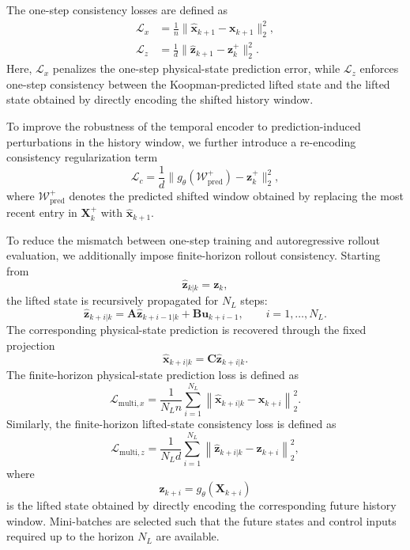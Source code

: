 \documentclass[journal]{IEEEtran}
\newcommand{\vx}{\mathbf{x}}
\newcommand{\vu}{\mathbf{u}}
\newcommand{\vz}{\mathbf{z}}
\newcommand{\mA}{\mathbf{A}}
\newcommand{\mB}{\mathbf{B}}
\newcommand{\mC}{\mathbf{C}}
\newcommand{\mX}{\mathbf{X}}
\begin{document}
{\color{red}The one-step consistency losses are defined as
\begin{align}
    \mathcal{L}_{x} &=
    \frac{1}{n}\|\hat{\vx}_{k+1}-\vx_{k+1}\|_2^2,
    \label{eq:loss_x}\\
    \mathcal{L}_{z} &=
    \frac{1}{d}\|\hat{\vz}_{k+1}-\vz_k^{+}\|_2^2.
    \label{eq:loss_z}
\end{align}
Here, $\mathcal{L}_x$ penalizes the one-step physical-state prediction error, while $\mathcal{L}_z$ enforces one-step consistency between the Koopman-predicted lifted state and the lifted state obtained by directly encoding the shifted history window.

To improve the robustness of the temporal encoder to prediction-induced perturbations in the history window, we further introduce a re-encoding consistency regularization term
\begin{equation}
    \mathcal{L}_{c} =
    \frac{1}{d}
    \bigl\|g_\theta(\mathcal{W}^{+}_{\mathrm{pred}})-\vz_k^{+}\bigr\|_2^2,
    \label{eq:loss_c}
\end{equation}
where $\mathcal{W}^{+}_{\mathrm{pred}}$ denotes the predicted shifted window obtained by replacing the most recent entry in $\mX_k^{+}$ with $\hat{\vx}_{k+1}$.

To reduce the mismatch between one-step training and autoregressive rollout evaluation, we additionally impose finite-horizon rollout consistency. Starting from
\begin{equation}
    \hat{\vz}_{k|k} = \vz_k,
\end{equation}
the lifted state is recursively propagated for $N_L$ steps:
\begin{equation}
    \hat{\vz}_{k+i|k}
    =
    \mA\hat{\vz}_{k+i-1|k}
    +
    \mB\vu_{k+i-1},
    \qquad
    i=1,\ldots,N_L.
    \label{eq:multi_step_lifted_rollout}
\end{equation}
The corresponding physical-state prediction is recovered through the fixed projection
\begin{equation}
    \hat{\vx}_{k+i|k}
    =
    \mC\hat{\vz}_{k+i|k}.
    \label{eq:multi_step_state_rollout}
\end{equation}
The finite-horizon physical-state prediction loss is defined as
\begin{equation}
    \mathcal{L}_{\mathrm{multi},x}
    =
    \frac{1}{N_L n}
    \sum_{i=1}^{N_L}
    \left\|
    \hat{\vx}_{k+i|k}
    -
    \vx_{k+i}
    \right\|_2^2.
    \label{eq:loss_multi_x}
\end{equation}
Similarly, the finite-horizon lifted-state consistency loss is defined as
\begin{equation}
    \mathcal{L}_{\mathrm{multi},z}
    =
    \frac{1}{N_L d}
    \sum_{i=1}^{N_L}
    \left\|
    \hat{\vz}_{k+i|k}
    -
    \vz_{k+i}
    \right\|_2^2,
    \label{eq:loss_multi_z}
\end{equation}
where
\begin{equation}
    \vz_{k+i}=g_\theta(\mX_{k+i})
\end{equation}
is the lifted state obtained by directly encoding the corresponding future history window. Mini-batches are selected such that the future states and control inputs required up to the horizon $N_L$ are available.

}
\end{document}
